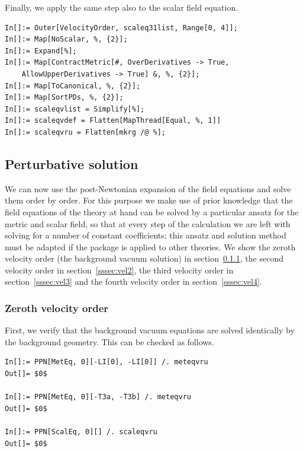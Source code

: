 \documentclass[notitlepage,a4paper,aps,prd,onecolumn,superscriptaddress,nofootinbib,groupedaddress,longbibliography]{revtex4-1}
\begin{document}
Finally, we apply the same step also to the scalar field equation.
\begin{lstlisting}
In[]:= Outer[VelocityOrder, scaleq31list, Range[0, 4]];
In[]:= Map[NoScalar, %, {2}];
In[]:= Expand[%];
In[]:= Map[ContractMetric[#, OverDerivatives -> True,
	AllowUpperDerivatives -> True] &, %, {2}];
In[]:= Map[ToCanonical, %, {2}];
In[]:= Map[SortPDs, %, {2}];
In[]:= scaleqvlist = Simplify[%];
In[]:= scaleqvdef = Flatten[MapThread[Equal, %, 1]]
In[]:= scaleqvru = Flatten[mkrg /@ %];
\end{lstlisting}

\subsection{Perturbative solution}\label{ssec:solution}
We can now use the post-Newtonian expansion of the field equations and solve them order by order. For this purpose we make use of prior knowledge that the field equations of the theory at hand can be solved by a particular ansatz for the metric and scalar field, so that at every step of the calculation we are left with solving for a number of constant coefficients; this ansatz and solution method must be adapted if the package is applied to other theories. We show the zeroth velocity order (the background vacuum solution) in section~\ref{sssec:vel0}, the second velocity order in section~\ref{sssec:vel2}, the third velocity order in section~\ref{sssec:vel3} and the fourth velocity order in section~\ref{sssec:vel4}.

\subsubsection{Zeroth velocity order}\label{sssec:vel0}
First, we verify that the background vacuum equations are solved identically by the background geometry. This can be checked as follows.
\begin{lstlisting}
In[]:= PPN[MetEq, 0][-LI[0], -LI[0]] /. meteqvru
Out[]= $0$

In[]:= PPN[MetEq, 0][-T3a, -T3b] /. meteqvru
Out[]= $0$

In[]:= PPN[ScalEq, 0][] /. scaleqvru
Out[]= $0$
\end{lstlisting}
\end{document}

